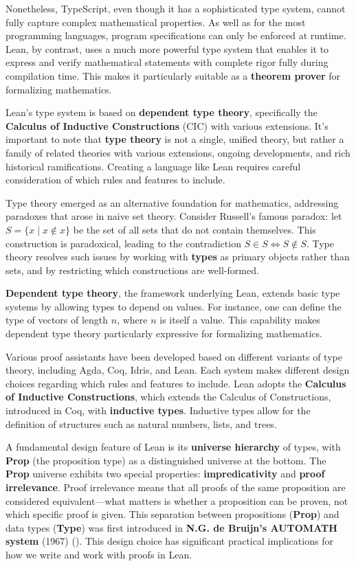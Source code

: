 Nonetheless, TypeScript, even though it has a sophisticated type system, cannot fully 
capture complex mathematical properties. As well as for the most programming languages, 
program specifications can only be enforced at runtime.  
Lean, by contrast, uses a much more powerful type system that enables it to 
express and verify mathematical statements with complete rigor fully during compilation time.  
This makes it particularly suitable as a \textbf{theorem prover} for formalizing mathematics.

Lean's type system is based on \textbf{dependent type theory}, specifically the 
\textbf{Calculus of Inductive Constructions} (CIC) with various extensions. 
It's important to note that \textbf{type theory} is not a single, unified theory, but rather a family of 
related theories with various extensions, ongoing developments, and rich historical ramifications. 
Creating a language like Lean requires careful consideration of which rules and features to include.

Type theory emerged as an alternative foundation for mathematics, addressing paradoxes 
that arose in naive set theory. Consider Russell's famous paradox: 
let $S = \{x \mid x \notin x\}$ be the set of all sets that do not contain themselves. 
This construction is paradoxical, leading to the contradiction $S \in S \iff S \notin S$. 
Type theory resolves such issues by working with \textbf{types} as primary objects rather than sets, 
and by restricting which constructions are well-formed.

\textbf{Dependent type theory}, the framework underlying Lean, extends basic type systems 
by allowing types to depend on values. For instance, one can define the type of vectors 
of length $n$, where $n$ is itself a value. This capability makes dependent type theory 
particularly expressive for formalizing mathematics.

Various proof assistants have been developed based on different variants of type theory, 
including Agda, Coq, Idris, and Lean. Each system makes different design choices regarding 
which rules and features to include. Lean adopts the \textbf{Calculus of Inductive Constructions}, 
which extends the Calculus of Constructions, introduced in Coq, with \textbf{inductive types}. 
Inductive types allow for the definition of structures 
such as natural numbers, lists, and trees.

A fundamental design feature of Lean is its \textbf{universe hierarchy} of types, with \textbf{Prop} 
(the proposition type) as a distinguished universe at the bottom. 
The \textbf{Prop} universe exhibits two 
special properties: \textbf{impredicativity} and \textbf{proof irrelevance}. 
Proof irrelevance means that all proofs of the same proposition are considered equivalent—what matters 
is whether a proposition can be proven, not which specific proof is given. 
This separation between propositions (\textbf{Prop}) and data types (\textbf{Type}) was first 
introduced in \textbf{N.G. de Bruijn's AUTOMATH system} (1967) 
(\cite{thompson1999types}). This design choice has significant practical implications 
for how we write and work with proofs in Lean.

